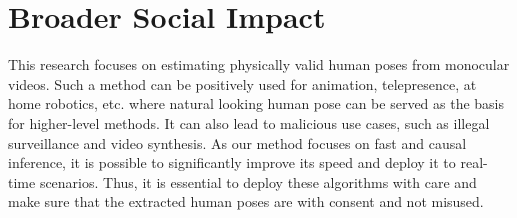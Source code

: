 \section{Broader Social Impact}
This research focuses on estimating physically valid human poses from monocular videos. Such a method can be positively used for animation, telepresence, at home robotics, etc. where natural looking human pose can be served as the basis for higher-level methods. It can also lead to malicious use cases, such as illegal surveillance and video synthesis. As our method focuses on fast and causal inference, it is possible to significantly improve its speed and deploy it to real-time scenarios. Thus, it is essential to deploy these algorithms with care and make sure that the extracted human poses are with consent and not misused.

